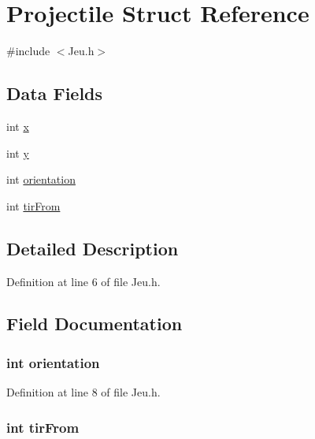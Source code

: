 \hypertarget{struct_projectile}{\section{Projectile Struct Reference}
\label{struct_projectile}
}


{\ttfamily \#include $<$Jeu.\-h$>$}

\subsection*{Data Fields}
\begin{DoxyCompactItemize}
\item 
int \hyperlink{struct_projectile_a6150e0515f7202e2fb518f7206ed97dc}{x}
\item 
int \hyperlink{struct_projectile_a0a2f84ed7838f07779ae24c5a9086d33}{y}
\item 
int \hyperlink{struct_projectile_a528d22a2a1651a4831eb643884a3c718}{orientation}
\item 
int \hyperlink{struct_projectile_a48cb20b0f4b6246bb181b3633e3c3f89}{tir\-From}
\end{DoxyCompactItemize}


\subsection{Detailed Description}


Definition at line 6 of file Jeu.\-h.



\subsection{Field Documentation}
\hypertarget{struct_projectile_a528d22a2a1651a4831eb643884a3c718}{
\subsubsection[{orientation}]{\setlength{\rightskip}{0pt plus 5cm}int orientation}}\label{struct_projectile_a528d22a2a1651a4831eb643884a3c718}


Definition at line 8 of file Jeu.\-h.

\hypertarget{struct_projectile_a48cb20b0f4b6246bb181b3633e3c3f89}{
\subsubsection[{tir\-From}]{\setlength{\rightskip}{0pt plus 5cm}int tir\-From}}\label{struct_projectile_a48cb20b0f4b6246bb181b3633e3c3f89}


